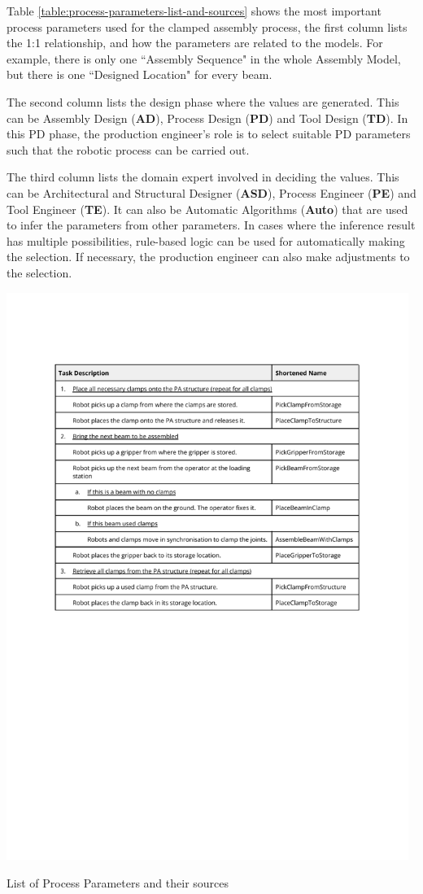 Table \ref{table:process-parameters-list-and-sources} shows the most important process parameters used for the clamped assembly process, the first column lists the 1:1 relationship, and how the parameters are related to the models. For example, there is only one ``Assembly Sequence" in the whole Assembly Model, but there is one ``Designed Location" for every beam.

The second column lists the design phase where the values are generated. This can be Assembly Design (\textbf{AD}), Process Design (\textbf{PD}) and Tool Design (\textbf{TD}). In this PD phase, the production engineer’s role is to select suitable PD parameters such that the robotic process can be carried out. 

The third column lists the domain expert involved in deciding the values. This can be Architectural and Structural Designer (\textbf{ASD}), Process Engineer (\textbf{PE}) and Tool Engineer (\textbf{TE}). It can also be Automatic Algorithms (\textbf{Auto}) that are used to infer the parameters from other parameters. In cases where the inference result has multiple possibilities, rule-based logic can be used for automatically making the selection. If necessary, the production engineer can also make adjustments to the selection.

\begin{table}[!hp]
    \includegraphics[page=4, trim=25.4mm 50mm 25.4mm 33mm, clip, width=0.98\textwidth]{tables/Tables in Chapter 6.pdf}
    \caption{List of Process Parameters and their sources}
    \label{table:process-parameters-list-and-sources}
\end{table}

